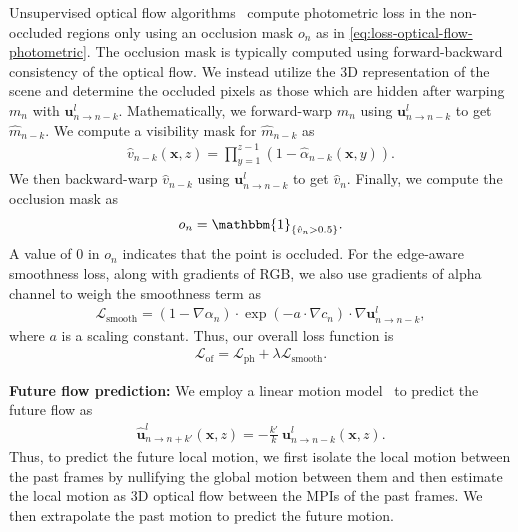 \documentclass[preprint]{vgtc}
\begin{document}
    Unsupervised optical flow algorithms~\cite{meister2018unflow} compute photometric loss in the non-occluded regions only using an occlusion mask $o_n$ as in \autoref{eq:loss-optical-flow-photometric}.
    The occlusion mask is typically computed using forward-backward consistency of the optical flow.
    We instead utilize the 3D representation of the scene and determine the occluded pixels as those which are hidden after warping $m_n$ with $\mathbf{u}^l_{n \rightarrow n-k}$.
    Mathematically, we forward-warp $m_n$ using $\mathbf{u}^l_{n \rightarrow n-k}$ to get $\hat{m}_{n-k}$.
    We compute a visibility mask for $\hat{m}_{n-k}$ as
    \begin{align}
        \hat{v}_{n-k}(\mathbf{x}, z) = \prod_{y=1}^{z-1}(1 - \hat{\alpha}_{n-k}(\mathbf{x}, y)).
    \end{align}
    We then backward-warp $\hat{v}_{n-k}$ using $\mathbf{u}^l_{n \rightarrow n-k}$ to get $\hat{v}_n$.
    Finally, we compute the occlusion mask as
    \begin{align}
       o_n = \mathbbm{1}_{\left\{ \hat{v}_n > 0.5 \right\}}.
    \end{align}
    A value of $0$ in $o_n$ indicates that the point is occluded.
For the edge-aware smoothness loss, along with gradients of RGB, we also use gradients of alpha channel to weigh the smoothness term as
    \begin{align}
        \mathcal{L}_{\text{smooth}} = (1 - \nabla \alpha_n) \cdot \exp(-a \cdot \nabla c_n) \cdot \nabla \mathbf{u}^l_{n \rightarrow n-k},
    \end{align}
where $a$ is a scaling constant.
    Thus, our overall loss function is
    \begin{align}
        \mathcal{L}_{\text{of}} = \mathcal{L}_{\text{ph}} + \lambda \mathcal{L}_{\text{smooth}}.
    \end{align}

    \textbf{Future flow prediction:}
    We employ a linear motion model~\cite{bao2019memcnet,bao2019dain} to predict the future flow as
    \begin{align}
        \hat{\mathbf{u}}^l_{n \rightarrow n+k'}(\mathbf{x}, z) = - \frac{k'}{k} \ \mathbf{u}^l_{n \rightarrow n-k}(\mathbf{x}, z).
        \label{eq:flow-prediction}
    \end{align}
    Thus, to predict the future local motion, we first isolate the local motion between the past frames by nullifying the global motion between them and then estimate the local motion as 3D optical flow between the MPIs of the past frames.
    We then extrapolate the past motion to predict the future motion.
\end{document}
